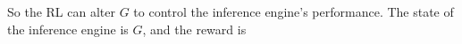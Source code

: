 \documentclass[12pt]{article}
\begin{document}
So the RL can alter $G$ to control the inference engine's performance.  The state of the inference engine is $G$, and the reward is 






\end{document}
